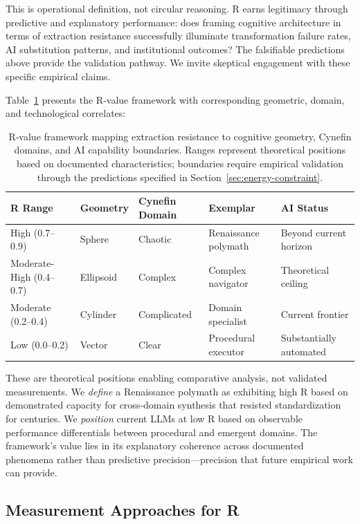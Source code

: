 This is operational definition, not circular reasoning. R earns legitimacy through predictive and explanatory performance: does framing cognitive architecture in terms of extraction resistance successfully illuminate transformation failure rates, AI substitution patterns, and institutional outcomes? The falsifiable predictions above provide the validation pathway. We invite skeptical engagement with these specific empirical claims.

Table~\ref{tab:r-values} presents the R-value framework with corresponding geometric, domain, and technological correlates:

\begin{table}[htbp]
\centering
\begin{tabular}{lllll}
\toprule
\textbf{R Range} & \textbf{Geometry} & \textbf{Cynefin Domain} & \textbf{Exemplar} & \textbf{AI Status} \\
\midrule
High (0.7--0.9) & Sphere & Chaotic & Renaissance polymath & Beyond current horizon \\
Moderate-High (0.4--0.7) & Ellipsoid & Complex & Complex navigator & Theoretical ceiling \\
Moderate (0.2--0.4) & Cylinder & Complicated & Domain specialist & Current frontier \\
Low (0.0--0.2) & Vector & Clear & Procedural executor & Substantially automated \\
\bottomrule
\end{tabular}
\caption{R-value framework mapping extraction resistance to cognitive geometry, Cynefin domains, and AI capability boundaries. Ranges represent theoretical positions based on documented characteristics; boundaries require empirical validation through the predictions specified in Section~\ref{sec:energy-constraint}.}
\label{tab:r-values}
\end{table}

These are theoretical positions enabling comparative analysis, not validated measurements. We \textit{define} a Renaissance polymath as exhibiting high R based on demonstrated capacity for cross-domain synthesis that resisted standardization for centuries. We \textit{position} current LLMs at low R based on observable performance differentials between procedural and emergent domains. The framework's value lies in its explanatory coherence across documented phenomena rather than predictive precision—precision that future empirical work can provide.

\subsection{Measurement Approaches for R}

